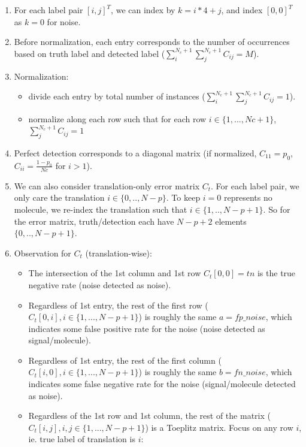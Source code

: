 \documentclass[11pt]{article}
\begin{document}
\begin{itemize}
    \begin{enumerate}
        \item For each label pair $[i,j]^T$, we can index by $k=i*4+j$, and index $[0,0]^T$ as $k=0$ for noise.
        \item Before normalization, each entry corresponds to the number of occurrences based on truth label and detected label ($\sum_{i}^{N_c+1}\sum_{j}^{N_c+1} C_{ij} = M$).
        \item Normalization: 
        \begin{itemize}
            \item divide each entry by total number of instances ($\sum_{i}^{N_c+1}\sum_{j}^{N_c+1} C_{ij} = 1$).
            \item normalize along each row such that for each row $i \in \{1,...,Nc+1\}$, $\sum_{j}^{N_c+1} C_{ij} = 1$
        \end{itemize}
        \item Perfect detection corresponds to a diagonal matrix (if normalized, $C_{11}=p_0$, $C_{ii}=\frac{1-p_0}{Nc}$ for $i>1$).
        \item We can also consider translation-only error matrix $C_t$. For each label pair, we only care the translation $i \in {\{0,..,N-p\}}$. To keep $i=0$ represents no molecule, we re-index the translation such that $i \in {\{1,..,N-p+1\}}$. So for the error matrix, truth/detection each have $N-p+2$ elements ${\{0,..,N-p+1\}}$.
        \item Observation for $C_t$ (translation-wise): 
            \begin{itemize}
                \item The intersection of the 1st column and 1st row $C_{t}[0,0]=tn$ is the true negative rate (noise detected as noise). 
                \item Regardless of 1st entry, the rest of the first row ($C_{t}[0,i], i \in \{1,...,N-p+1\}$) is roughly the same $a=fp\_noise$, which indicates some false positive rate for the noise (noise detected as signal/molecule).
                \item Regardless of 1st entry, the rest of the first column ($C_{t}[i,0], i \in \{1,...,N-p+1\}$) is roughly the same $b=fn\_noise$, which indicates some false negative rate for the noise (signal/molecule detected as noise).
                \item Regardless of the 1st row and 1st column, the rest of the matrix ($C_{t}[i,j], i,j \in \{1,...,N-p+1\}$) is a Toeplitz matrix. Focus on any row $i$, ie. true label of translation is $i$: 

\end{itemize}
\end{enumerate}
\end{itemize}
\end{document}
